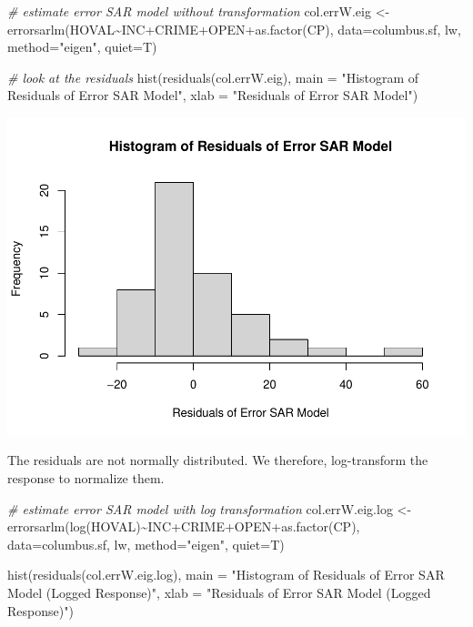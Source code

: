 \documentclass[
]{article}
\newenvironment{Shaded}{\begin{snugshade}}{\end{snugshade}}
\newcommand{\AttributeTok}[1]{\textcolor[rgb]{0.77,0.63,0.00}{#1}}
\newcommand{\CommentTok}[1]{\textcolor[rgb]{0.56,0.35,0.01}{\textit{#1}}}
\newcommand{\FunctionTok}[1]{\textcolor[rgb]{0.00,0.00,0.00}{#1}}
\newcommand{\NormalTok}[1]{#1}
\newcommand{\OtherTok}[1]{\textcolor[rgb]{0.56,0.35,0.01}{#1}}
\newcommand{\SpecialCharTok}[1]{\textcolor[rgb]{0.00,0.00,0.00}{#1}}
\newcommand{\StringTok}[1]{\textcolor[rgb]{0.31,0.60,0.02}{#1}}
\begin{document}
\begin{Shaded}
\begin{Highlighting}[]
\CommentTok{\# estimate error SAR model without transformation}
\NormalTok{col.errW.eig }\OtherTok{\textless{}{-}} \FunctionTok{errorsarlm}\NormalTok{(HOVAL}\SpecialCharTok{\textasciitilde{}}\NormalTok{INC}\SpecialCharTok{+}\NormalTok{CRIME}\SpecialCharTok{+}\NormalTok{OPEN}\SpecialCharTok{+}\FunctionTok{as.factor}\NormalTok{(CP), }\AttributeTok{data=}\NormalTok{columbus.sf,}
\NormalTok{ lw, }\AttributeTok{method=}\StringTok{"eigen"}\NormalTok{, }\AttributeTok{quiet=}\NormalTok{T)}

\CommentTok{\# look at the residuals}
\FunctionTok{hist}\NormalTok{(}\FunctionTok{residuals}\NormalTok{(col.errW.eig), }\AttributeTok{main =} \StringTok{"Histogram of Residuals of Error SAR Model"}\NormalTok{, }\AttributeTok{xlab =} \StringTok{"Residuals of Error SAR Model"}\NormalTok{)}
\end{Highlighting}
\end{Shaded}

\includegraphics{midterm-project_files/figure-latex/unnamed-chunk-37-1.pdf}

The residuals are not normally distributed. We therefore, log-transform
the response to normalize them.

\begin{Shaded}
\begin{Highlighting}[]
\CommentTok{\# estimate error SAR model with log transformation}
\NormalTok{col.errW.eig.log }\OtherTok{\textless{}{-}} \FunctionTok{errorsarlm}\NormalTok{(}\FunctionTok{log}\NormalTok{(HOVAL)}\SpecialCharTok{\textasciitilde{}}\NormalTok{INC}\SpecialCharTok{+}\NormalTok{CRIME}\SpecialCharTok{+}\NormalTok{OPEN}\SpecialCharTok{+}\FunctionTok{as.factor}\NormalTok{(CP), }\AttributeTok{data=}\NormalTok{columbus.sf,}
\NormalTok{ lw, }\AttributeTok{method=}\StringTok{"eigen"}\NormalTok{, }\AttributeTok{quiet=}\NormalTok{T)}

\FunctionTok{hist}\NormalTok{(}\FunctionTok{residuals}\NormalTok{(col.errW.eig.log), }\AttributeTok{main =} \StringTok{"Histogram of Residuals of Error SAR Model (Logged Response)"}\NormalTok{, }\AttributeTok{xlab =} \StringTok{"Residuals of Error SAR Model (Logged Response)"}\NormalTok{)}
\end{Highlighting}
\end{Shaded}
\end{document}
